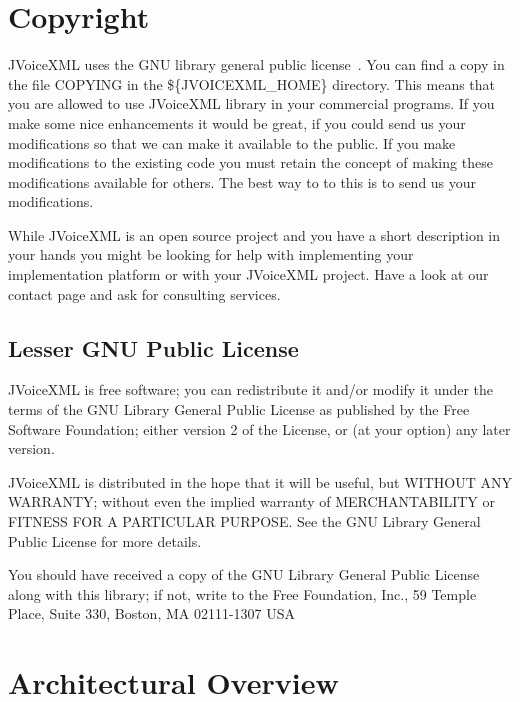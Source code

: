 \documentclass[11pt,a4paper]{article}
\begin{document}
\section{Copyright}
\label{sec:copyright}

JVoiceXML uses the GNU library general public license~\cite{gnu:lgpg}. 
You can find a copy in the file COPYING in the \$\{JVOICEXML\_HOME\}
directory. This means that you are allowed to use JVoiceXML
library in your commercial programs. If you make some nice
enhancements it would be great, if you could send us your
modifications so that we can make it available to the public.
If you make modifications to the existing code you must retain the concept of
making these modifications available for others. The best way to to this is to
send us your modifications.

While JVoiceXML is an open source project and you have a short
description in your hands you might be looking for help with implementing your
implementation platform or with your JVoiceXML project. Have a look at our
contact page and ask for consulting services.

\subsection{Lesser GNU Public License}

JVoiceXML is free software; you can redistribute it and/or
modify it under the terms of the GNU Library General Public
License as published by the Free Software Foundation; either
version 2 of the License, or (at your option) any later version.

JVoiceXML is distributed in the hope that it will be useful,
but WITHOUT ANY WARRANTY; without even the implied warranty of
MERCHANTABILITY or FITNESS FOR A PARTICULAR PURPOSE. See the GNU
Library General Public License for more details.

You should have received a copy of the GNU Library General Public
License along with this library; if not, write to the Free
Foundation, Inc., 59 Temple Place, Suite 330, Boston, MA  02111-1307  USA

\section{Architectural Overview}
\label{sec:arch-overv}
\end{document}
